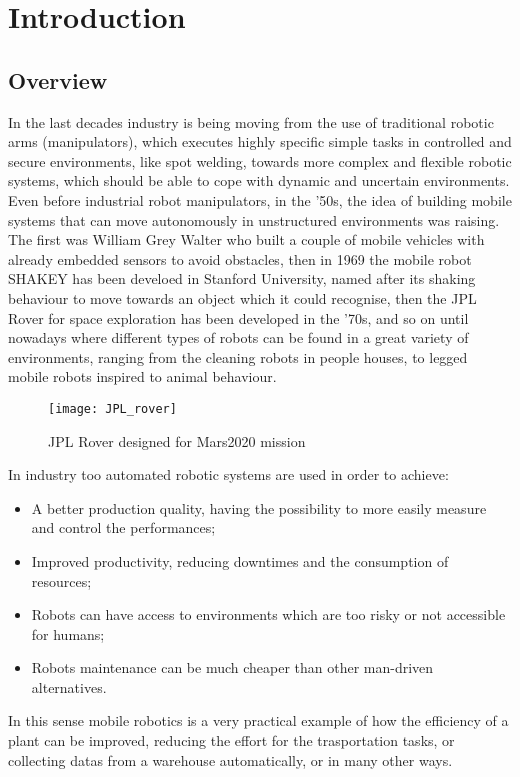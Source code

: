 \chapter{Introduction}
\label{chapter1}

\section{Overview}
In the last decades industry is being moving from the use of traditional robotic arms (manipulators), which executes highly specific simple tasks in controlled and secure environments, like spot welding, towards more complex and flexible robotic systems, which should be able to cope with dynamic and uncertain environments. \\ 
Even before industrial robot manipulators, in the '50s, the idea of building mobile systems that can move autonomously in unstructured environments was raising. The first was William Grey Walter who built a couple of mobile vehicles with already embedded sensors to avoid obstacles, then in 1969 the mobile robot SHAKEY has been develoed in Stanford University, named after its shaking behaviour to move towards an object which it could recognise, then the JPL Rover for space exploration has been developed in the '70s, and so on until nowadays where different types of robots can be found in a great variety of environments, ranging from the cleaning robots in people houses, to legged mobile robots inspired to animal behaviour.
\begin{figure}[h!]
	\centering
	\texttt{[image: JPL\_rover]}
	\caption{JPL Rover designed for Mars2020 mission}
\end{figure}
In industry too automated robotic systems are used in order to achieve:
\begin{itemize}
	\item A better production quality, having the possibility to more easily measure and control the performances;
	\item Improved productivity, reducing downtimes and the consumption of resources;
	\item Robots can have access to environments which are too risky or not accessible for humans;
	\item Robots maintenance can be much cheaper than other man-driven alternatives. 
\end{itemize}
In this sense mobile robotics is a very practical example of how the efficiency of a plant can be improved, reducing the effort for the trasportation tasks, or collecting datas from a warehouse automatically, or in many other ways.\\
